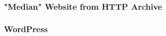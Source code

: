     



\subsubsection{"Median" Website from HTTP Archive}













\subsubsection{WordPress}



